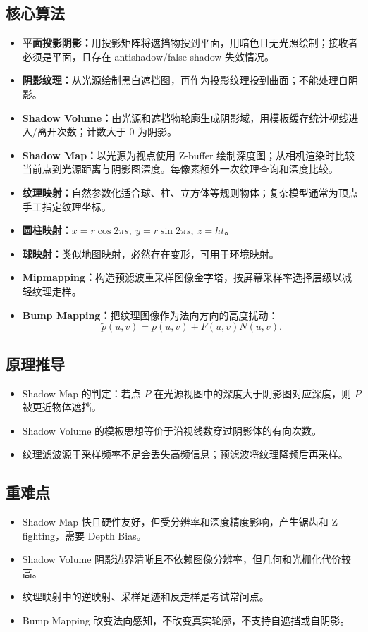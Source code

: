 \documentclass[UTF8,fontset=fandol,11pt]{ctexart}
\newcommand{\key}[1]{\textbf{#1}}
\begin{document}
\subsection{核心算法}
\begin{itemize}
  \item \key{平面投影阴影：}用投影矩阵将遮挡物投到平面，用暗色且无光照绘制；接收者必须是平面，且存在 antishadow/false shadow 失效情况。
  \item \key{阴影纹理：}从光源绘制黑白遮挡图，再作为投影纹理投到曲面；不能处理自阴影。
  \item \key{Shadow Volume：}由光源和遮挡物轮廓生成阴影域，用模板缓存统计视线进入/离开次数；计数大于 0 为阴影。
  \item \key{Shadow Map：}以光源为视点使用 Z-buffer 绘制深度图；从相机渲染时比较当前点到光源距离与阴影图深度。每像素额外一次纹理查询和深度比较。
  \item \key{纹理映射：}自然参数化适合球、柱、立方体等规则物体；复杂模型通常为顶点手工指定纹理坐标。
  \item \key{圆柱映射：}$x=r\cos 2\pi s,\ y=r\sin 2\pi s,\ z=ht$。
  \item \key{球映射：}类似地图映射，必然存在变形，可用于环境映射。
  \item \key{Mipmapping：}构造预滤波重采样图像金字塔，按屏幕采样率选择层级以减轻纹理走样。
  \item \key{Bump Mapping：}把纹理图像作为法向方向的高度扰动：
  \[
    \tilde p(u,v)=p(u,v)+F(u,v)N(u,v).
  \]
\end{itemize}
\subsection{原理推导}
\begin{itemize}
  \item Shadow Map 的判定：若点 $P$ 在光源视图中的深度大于阴影图对应深度，则 $P$ 被更近物体遮挡。
  \item Shadow Volume 的模板思想等价于沿视线数穿过阴影体的有向次数。
  \item 纹理滤波源于采样频率不足会丢失高频信息；预滤波将纹理降频后再采样。
\end{itemize}
\subsection{重难点}
\begin{itemize}
  \item Shadow Map 快且硬件友好，但受分辨率和深度精度影响，产生锯齿和 Z-fighting，需要 Depth Bias。
  \item Shadow Volume 阴影边界清晰且不依赖图像分辨率，但几何和光栅化代价较高。
  \item 纹理映射中的逆映射、采样足迹和反走样是考试常问点。
  \item Bump Mapping 改变法向感知，不改变真实轮廓，不支持自遮挡或自阴影。
\end{itemize}
\end{document}
